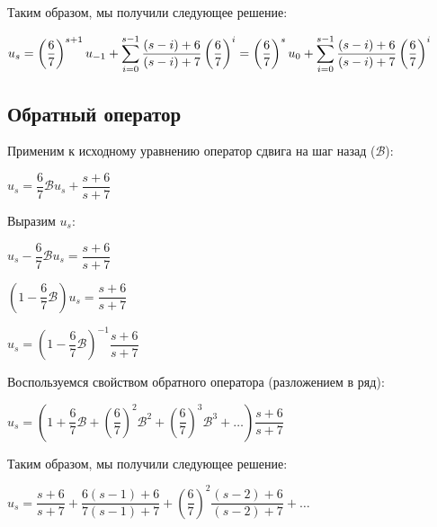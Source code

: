 \documentclass[14pt,fleqn]{extarticle}
\begin{document}
	\newpage
	Таким образом, мы получили следующее решение:\\
	\begin{center}
		$u_s =  \left(\dfrac{6}{7}\right)^{s+1} u_{-1} + \smashoperator[r]{\sum_{i=0}^{s-1}}\dfrac{(s-i)+6}{(s-i)+7}\left(\dfrac{6}{7}\right)^i = \left(\dfrac{6}{7}\right)^{s} u_{0} + \smashoperator[r]{\sum_{i=0}^{s-1}}\dfrac{(s-i)+6}{(s-i)+7}\left(\dfrac{6}{7}\right)^i$
	\end{center}

	\subsection*{Обратный оператор}
	Применим к исходному уравнению оператор сдвига на шаг назад ($\mathcal{B}$):
	\begin{center}
		$u_s = \dfrac{6}{7}\mathcal{B}u_s + \dfrac{s+6}{s+7}$
	\end{center}
	Выразим $u_s$:
	\begin{center}
		$u_s - \dfrac{6}{7}\mathcal{B}u_s = \dfrac{s+6}{s+7}$
	\end{center}
	\begin{center}
		$\left(1 - \dfrac{6}{7}\mathcal{B}\right)u_s = \dfrac{s+6}{s+7}$
	\end{center}
	\begin{center}
		$u_s =\left(1 - \dfrac{6}{7}\mathcal{B}\right)^{-1}\dfrac{s+6}{s+7}$
	\end{center}
	Воспользуемся свойством обратного оператора (разложением в ряд):
	\begin{center}
		$u_s = \left(1 + \dfrac{6}{7}\mathcal{B} + \left(\dfrac{6}{7}\right)^2\mathcal{B}^2 + \left(\dfrac{6}{7}\right)^3\mathcal{B}^3 + \ldots\right)\dfrac{s+6}{s+7}$
	\end{center}
	Таким образом, мы получили следующее решение:\\
	\begin{center}
		$u_s = \dfrac{s+6}{s+7} + \dfrac{6(s-1)+6}{7(s-1)+7} + \left(\dfrac{6}{7}\right)^2\dfrac{(s-2)+6}{(s-2)+7} + \ldots$
	\end{center}
	\newpage
\end{document}
